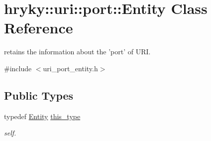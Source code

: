 \hypertarget{classhryky_1_1uri_1_1port_1_1_entity}{\section{hryky\-:\-:uri\-:\-:port\-:\-:Entity Class Reference}
\label{classhryky_1_1uri_1_1port_1_1_entity}
}


retains the information about the 'port' of U\-R\-I.  




{\ttfamily \#include $<$uri\-\_\-port\-\_\-entity.\-h$>$}

\subsection*{Public Types}
\begin{DoxyCompactItemize}
\item 
\hypertarget{classhryky_1_1uri_1_1port_1_1_entity_a5039b7839f1b865fba0d30d01eac50f5}{typedef \hyperlink{classhryky_1_1uri_1_1port_1_1_entity}{Entity} \hyperlink{classhryky_1_1uri_1_1port_1_1_entity_a5039b7839f1b865fba0d30d01eac50f5}{this\-\_\-type}}\label{classhryky_1_1uri_1_1port_1_1_entity_a5039b7839f1b865fba0d30d01eac50f5}

\begin{DoxyCompactList}\small\item\em self. \end{DoxyCompactList}\end{DoxyCompactItemize}
